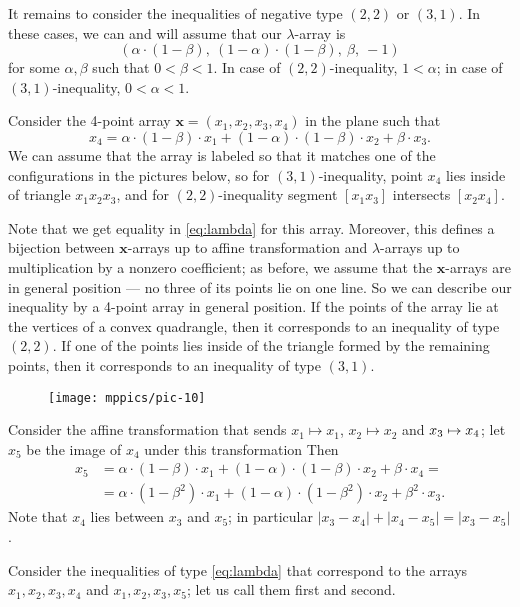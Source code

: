 \documentclass[a4paper,10pt]{article}
\begin{document}
It remains to consider the inequalities of negative type $(2,2)$ or $(3,1)$.
In these cases, we can and will assume that our $\lambda$-array is
\[(\alpha\cdot (1-\beta),\  (1-\alpha)\cdot(1-\beta),\  \beta,\ -1)\] 
for some $\alpha,\beta$ such that $0< \beta< 1$.
In case of $(2,2)$-inequality, $1<\alpha$;
in case of $(3,1)$-inequality, $0<\alpha<1$.

Consider the 4-point array $\bm{x}=(x_1,x_2,x_3,x_4)$  in the plane such that 
\[x_4=\alpha\cdot (1-\beta)\cdot x_1+(1-\alpha)\cdot(1-\beta)\cdot x_2+\beta\cdot x_3.\]
We can assume that the array is labeled so that it matches one of the configurations in the pictures below,
so for $(3,1)$-inequality, point $x_4$ lies inside of triangle $x_1x_2x_3$,
and for $(2,2)$-inequality segment $[x_1x_3]$ intersects $[x_2x_4]$.

Note that we get equality in \ref{eq:lambda} for this array.
Moreover, this defines a bijection between $\bm{x}$-arrays up to affine transformation and $\lambda$-arrays up to multiplication by a nonzero coefficient;
as before, we assume that the $\bm{x}$-arrays are in general position --- no three of its points lie on one line.
So we can describe our inequality by a 4-point array in general position.
If the points of the array lie at the vertices of a convex quadrangle,
then it corresponds to an inequality of type $(2,2)$.
If one of the points lies inside of the triangle formed by the remaining points, then it corresponds to an inequality of type $(3,1)$.

\begin{figure}[ht!]
\vskip-0mm
\centering
\texttt{[image: mppics/pic-10]}
\vskip0mm
\end{figure}

Consider the affine transformation that sends $x_1\mapsto x_1$, $x_2\mapsto x_2$ and $x_3\z\mapsto x_4$;
let $x_5$ be the image of $x_4$ under this transformation
Then
\begin{align*}
x_5&=\alpha\cdot (1-\beta)\cdot x_1+(1-\alpha)\cdot(1-\beta)\cdot x_2+\beta\cdot x_4=
\\
&=\alpha\cdot (1-\beta^2)\cdot x_1+(1-\alpha)\cdot(1-\beta^2)\cdot x_2+\beta^2\cdot x_3.
\end{align*}
Note that $x_4$ lies between $x_3$ and $x_5$;
in particular $|x_3-x_4|+|x_4-x_5|=|x_3-x_5|$.

Consider the inequalities of type \ref{eq:lambda} that correspond to the arrays $x_1,x_2,x_3,x_4$ and $x_1,x_2,x_3,x_5$;
let us call them first and second.
\end{document}
